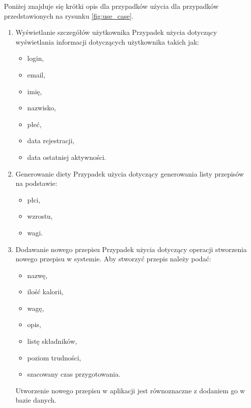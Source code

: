 Poniżej znajduje się krótki opis dla przypadków użycia dla przypadków przedstawionych na rysunku \ref{fig:use_case}.

\begin{enumerate}
    \item Wyświetlanie szczegółów użytkownika\newline
    Przypadek użycia dotyczący wyświetlania informacji dotyczących użytkownika takich jak:
    \begin{itemize}
        \item login,
        \item email,
        \item imię,
        \item nazwisko,
        \item płeć,
        \item data rejestracji,
        \item data ostatniej aktywności.
    \end{itemize}
    
    \item Generowanie diety\newline
    Przypadek użycia dotyczący generowania listy przepisów na podstawie:
    \begin{itemize}
        \item płci,
        \item wzrostu,
        \item wagi.
    \end{itemize}
    
    \item Dodawanie nowego przepisu\newline
    Przypadek użycia dotyczący operacji stworzenia nowego przepisu w systemie. Aby stworzyć przepis należy podać:
    \begin{itemize}
        \item nazwę,
        \item ilość kalorii,
        \item wagę,
        \item opis,
        \item listę składników,
        \item poziom trudności,
        \item szacowany czas przygotowania.
    \end{itemize}
    Utworzenie nowego przepisu w aplikacji jest równoznaczne z dodaniem go w bazie danych.
    

\end{enumerate}
